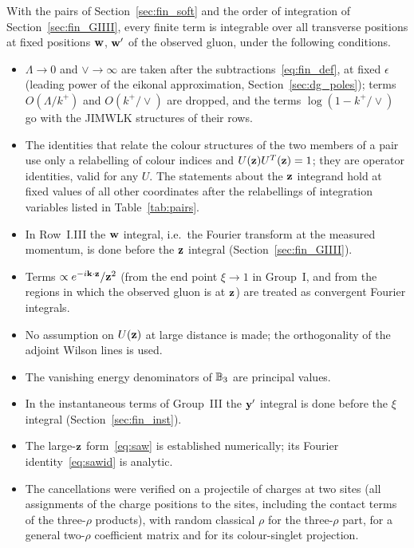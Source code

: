 With the pairs of Section~\ref{sec:fin_soft} and the order of integration of Section~\ref{sec:fin_GIIII}, every finite term is integrable over all transverse positions at fixed positions $\mathbf{w}$, $\mathbf{w}'$ of the observed gluon, under the following conditions.
\begin{itemize}
\item[(C1)] $\Lambda\to0$ and $\vee\to\infty$ are taken after the subtractions~\eqref{eq:fin_def}, at fixed $\epsilon$ (leading power of the eikonal approximation, Section~\ref{sec:dg_poles}); terms $O(\Lambda/k^+)$ and $O(k^+/\vee)$ are dropped, and the terms $\log(1-k^+/\vee)$ go with the JIMWLK structures of their rows.
\item[(C2)] The identities that relate the colour structures of the two members of a pair use only a relabelling of colour indices and $U(\mathbf{z})U^T(\mathbf{z})=1$; they are operator identities, valid for any $U$. The statements about the $\mathbf{z}$ integrand hold at fixed values of all other coordinates after the relabellings of integration variables listed in Table~\ref{tab:pairs}.
\item[(C3)] In Row~I.III the $\mathbf{w}$ integral, i.e.\ the Fourier transform at the measured momentum, is done before the $\mathbf{z}$ integral (Section~\ref{sec:fin_GIIII}).
\item[(C4)] Terms $\propto e^{-i\mathbf{k}\cdot\mathbf{z}}/\mathbf{z}^2$ (from the end point $\xi\to1$ in Group~I, and from the regions in which the observed gluon is at $\mathbf{z}$) are treated as convergent Fourier integrals.
\item[(C5)] No assumption on $U(\mathbf{z})$ at large distance is made; the orthogonality of the adjoint Wilson lines is used.
\item[(C6)] The vanishing energy denominators of $\mathbb{B}_3$ are principal values.
\item[(C7)] In the instantaneous terms of Group~III the $\mathbf{y}'$ integral is done before the $\xi$ integral (Section~\ref{sec:fin_inst}).
\item[(C8)] The large-$\mathbf{z}$ form~\eqref{eq:saw} is established numerically; its Fourier identity~\eqref{eq:sawid} is analytic.
\item[(C9)] The cancellations were verified on a projectile of charges at two sites (all assignments of the charge positions to the sites, including the contact terms of the three-$\rho$ products), with random classical $\rho$ for the three-$\rho$ part, for a general two-$\rho$ coefficient matrix and for its colour-singlet projection.

\end{itemize}
